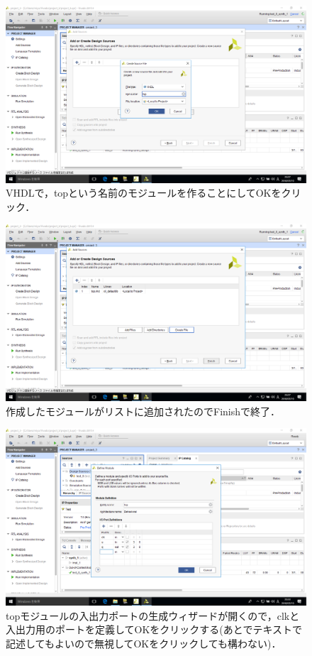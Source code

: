 \documentclass[a4paper,dvipdfmx]{jsarticle}
\begin{document}
 \begin{figure}[H]
  \begin{center}
   \includegraphics[width=.8\textwidth]{chapter08_figures/VirtualBox_Windows10_19_03_2018_23_27_50.png}
  \end{center}
  \caption{VHDLで，topという名前のモジュールを作ることにしてOKをクリック．}
 \end{figure}

 \begin{figure}[H]
  \begin{center}
   \includegraphics[width=.8\textwidth]{chapter08_figures/VirtualBox_Windows10_19_03_2018_23_28_00.png}
  \end{center}
  \caption{作成したモジュールがリストに追加されたのでFinishで終了．}
 \end{figure}

 \begin{figure}[H]
  \begin{center}
   \includegraphics[width=.8\textwidth]{chapter08_figures/VirtualBox_Windows10_19_03_2018_23_33_30.png}
  \end{center}
  \caption{topモジュールの入出力ポートの生成ウィザードが開くので，clkと入出力用のポートを定義してOKをクリックする(あとでテキストで記述してもよいので無視してOKをクリックしても構わない)．}
 \end{figure}
\end{document}
